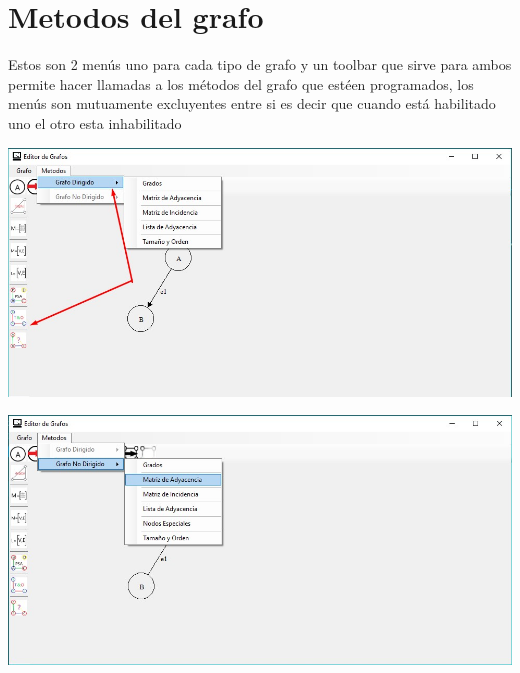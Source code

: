 \documentclass[titlepage]{report}
\begin{document}
\chapter*{Metodos del grafo}
Estos son 2 men\'{u}s uno para cada tipo de grafo y un toolbar que sirve para ambos permite hacer llamadas a los m\'{e}todos del grafo que est\'{e}en programados, los  men\'{u}s son mutuamente excluyentes entre si es decir que cuando est\'{a} habilitado uno el otro esta inhabilitado
\begin{center}
\includegraphics[scale=.60]{Imagen/4.jpg} 
\end{center}
\begin{center}
\includegraphics[scale=.60]{Imagen/5.jpg} 
\end{center}
\end{document}
